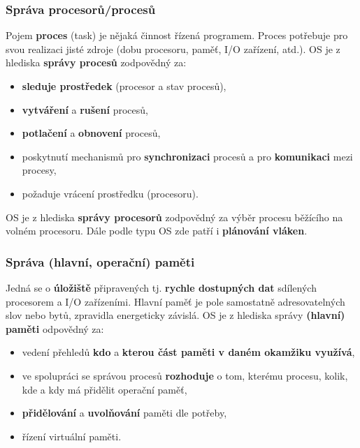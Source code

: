 \subsubsection{Správa procesorů/procesů}
Pojem \textbf{proces} (task) je nějaká činnost řízená programem. Proces potřebuje pro svou realizaci jisté zdroje (dobu procesoru, paměť, I/O zařízení, atd.). OS je z hlediska \textbf{správy procesů} zodpovědný za:
\begin{itemize}
	\item \textbf{sleduje prostředek} (procesor a stav procesů),
	\item \textbf{vytváření} a \textbf{rušení} procesů,
	\item \textbf{potlačení} a \textbf{obnovení} procesů,
	\item poskytnutí mechanismů pro \textbf{synchronizaci} procesů a pro \textbf{komunikaci} mezi procesy,
	\item požaduje vrácení prostředku (procesoru).
\end{itemize}
OS je z hlediska \textbf{správy procesorů} zodpovědný za výběr procesu běžícího na volném procesoru. Dále podle typu OS zde patří i \textbf{plánování vláken}.

\subsubsection{Správa (hlavní, operační) paměti}
Jedná se o \textbf{úložiště} připravených tj. \textbf{rychle dostupných dat} sdílených procesorem a I/O zařízeními. Hlavní paměť je pole samostatně adresovatelných slov nebo bytů, zpravidla energeticky závislá. OS je z hlediska správy \textbf{(hlavní) paměti} odpovědný za:
\begin{itemize}
	\item vedení přehledů \textbf{kdo} a \textbf{kterou část paměti v daném okamžiku využívá},
	\item ve spolupráci se správou procesů \textbf{rozhoduje} o tom, kterému procesu, kolik, kde a kdy má přidělit operační paměť,
	\item \textbf{přidělování} a \textbf{uvolňování} paměti dle potřeby,
	\item řízení virtuální paměti.
\end{itemize}

